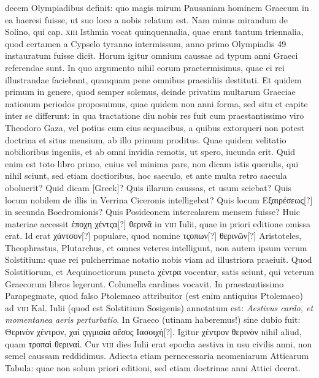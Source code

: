\begin{parnumbers}
decem Olympiadibus definit: quo magis mirum Pausaniam
hominem Graecum in ea haeresi fuisse, ut suo loco a nobis relatum est.
{}
Nam minus mirandum de Solino, qui cap. \textsc{xiii} Isthmia vocat
quinquennalia, quae erant tantum triennalia, quod certamen a Cypselo
tyranno intermissum, anno primo Olympiadis 49 instauratum
fuisse dicit.
Horum igitur omnium caussae ad typum anni Graeci referendae
sunt.
In quo argumento nihil eorum praetermisimus, quae
ei rei illustrandae faciebant, quanquam pene omnibus praesidiis
destituti.
Et quidem primum in genere, quod semper solemus, deinde
privatim multarum Graeciae nationum periodos proposuimus,
quae quidem non anni forma, sed situ et capite inter se differunt: in
qua tractatione diu nobis res fuit cum praestantissimo viro Theodoro
Gaza, vel potius cum eius sequacibus, a quibus extorqueri non
potest doctrina et situs mensium, ab illo primum proditus. 
Quae quidem
velitatio nobilioribus ingeniis, et ab omni invidia remotis, ut
spero, iucunda erit.
Quid enim est toto libro primo, cuius vel minima
pars, non dicam istis querulis, qui nihil sciunt, sed etiam doctioribus,
hoc saeculo, et ante multa retro saecula oboluerit?
Quid dicam \textgreek{[Greek]}?
Quis illarum caussas, et usum sciebat?
Quis
locum nobilem de illis in Verrina Ciceronis intelligebat?
Quis locum
\textgreek{Εξαιρέσεως[?]} in secunda Boedromionis?
Quis Posideonem intercalarem
mensem fuisse?
Huic materiae accessit \textgreek{ἐποχη χέντςα[?] θερινᾶ}
in \textsc{viii} Iulii, quae in priori editione omissa erat.
Id erat \textgreek{χάντσον[?]}
populare, quod nomine \textgreek{τςοπων[?] θερινῶν[?]}
 Aristoteles, Theophrastus,
Plutarchus, et omnes veteres intelligunt, non autem ipsum verum
Solstitium: quae rei pulcherrimae notatio nobis viam ad illustriora
praeiuit.
Quod Solstitiorum, et Aequinoctiorum puncta \textgreek{χέντρα} vocentur,
satis sciunt, qui veterum Graecorum libros legerunt.
Columella
cardines vocavit.
In praestantissimo Parapegmate, quod falso
Ptolemaeo attribuitor (est enim antiquius Ptolemaeo) ad \textsc{viii} Kal.
Iulii (quod est Solstitium Sosigenis) annotatum est: \textit{Aestivus cardo,
et momentanea aeris perturbatio}.
In Graeco (utinam haberemus!)
sine dubio fuit: \textgreek{Θερινὸν χέντρον, χαὶ ςιγμιαία αἔσος Ιασοιχή[?]}.
Igitur \textgreek{χέντρον
θερινὸν} nihil aliud, quam \textgreek{τροπαὶ θεριναί}.
Cur \textsc{viii} dies Iulii erat
epocha aestiva in usu civilis anni, non semel caussam reddidimus. 
Adiecta etiam pernecessaria neomeniarum Atticarum Tabula: quae
non solum priori editioni, sed etiam doctrinae anni Attici deerat.


\end{parnumbers}
